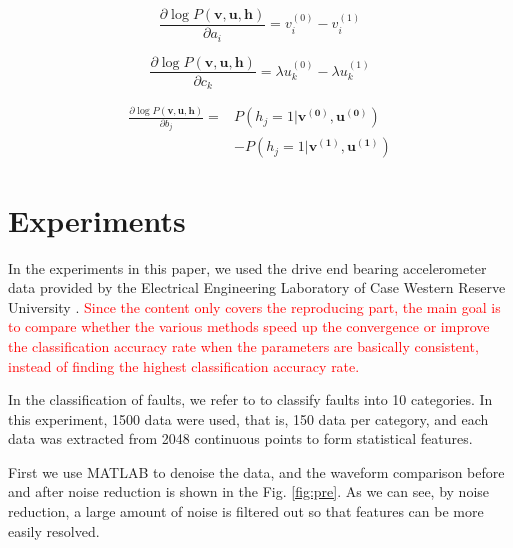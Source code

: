 \documentclass{bioinfo}
\begin{document}
\begin{equation}
\frac{\partial \log P(\boldsymbol{v}, \boldsymbol{u}, \boldsymbol{h})}{\partial a_{i}}=v_i^{(0)}-v_i^{(1)}
\end{equation}

\begin{equation}
\frac{\partial \log P(\boldsymbol{v}, \boldsymbol{u}, \boldsymbol{h})}{\partial c_{k}}=\lambda u_k^{(0)}-\lambda u_k^{(1)}
\end{equation}

\begin{equation}
\begin{aligned} 
\frac{\partial \log P(\boldsymbol{v}, \boldsymbol{u}, \boldsymbol{h})}{\partial b_{j}}=&P(h_j=1|\boldsymbol{v^{(0)}},\boldsymbol{u^{(0)}})\\&-P(h_j=1|\boldsymbol{v^{(1)}},\boldsymbol{u^{(1)}})
\end{aligned}
\end{equation}

\section{Experiments}
In the experiments in this paper, we used the drive end bearing accelerometer data provided by the Electrical Engineering Laboratory of Case Western Reserve University \cite{data}. \textcolor{red}{Since the content only covers the reproducing part, the main goal is to compare whether the various methods speed up the convergence or improve the classification accuracy rate when the parameters are basically consistent, instead of finding the highest classification accuracy rate.}

In the classification of faults, we refer to \cite{guangquan2016fault} to classify faults into 10 categories. In this experiment, 1500 data were used, that is, 150 data per category, and each data was extracted from 2048 continuous points to form statistical features.

First we use MATLAB to denoise the data, and the waveform comparison before and after noise reduction is shown in the Fig. \ref{fig:pre}. As we can see, by noise reduction, a large amount of noise is filtered out so that features can be more easily resolved.
\end{document}
